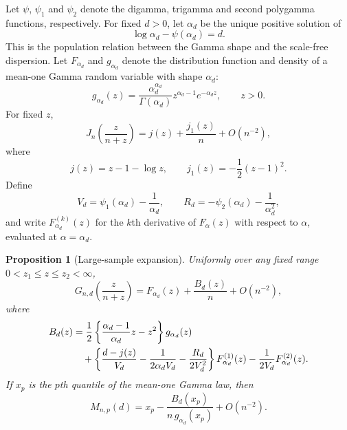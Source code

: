 \documentclass[11pt]{article}
\newtheorem{proposition}[theorem]{Proposition}
\theoremstyle{remark}
\begin{document}
Let $\psi$, $\psi_1$ and $\psi_2$ denote the digamma, trigamma and second polygamma functions, respectively. For fixed $d>0$, let $\alpha_d$ be the unique positive solution of
\begin{equation}
 \log\alpha_d-\psi(\alpha_d)=d.
 \label{eq:alpha_d}
\end{equation}
This is the population relation between the Gamma shape and the scale-free dispersion. Let $F_{\alpha_d}$ and $g_{\alpha_d}$ denote the distribution function and density of a mean-one Gamma random variable with shape $\alpha_d$:
\begin{equation}
 g_{\alpha_d}(z)
 =\frac{\alpha_d^{\alpha_d}}{\Gamma(\alpha_d)}
 z^{\alpha_d-1}e^{-\alpha_d z},
 \qquad z>0.
 \label{eq:mean_one_gamma}
\end{equation}
For fixed $z$,
\begin{equation}
 J_n\!\left(\frac{z}{n+z}\right)
 =j(z)+\frac{j_1(z)}{n}+O(n^{-2}),
 \label{eq:J_large_n}
\end{equation}
where
\begin{equation}
 j(z)=z-1-\log z,
 \qquad
 j_1(z)=-\frac12(z-1)^2.
 \label{eq:j_def}
\end{equation}
Define
\begin{equation}
 V_d=\psi_1(\alpha_d)-\frac1{\alpha_d},
 \qquad
 R_d=-\psi_2(\alpha_d)-\frac1{\alpha_d^2},
 \label{eq:VR}
\end{equation}
and write $F_{\alpha_d}^{(k)}(z)$ for the $k$th derivative of $F_\alpha(z)$ with respect to $\alpha$, evaluated at $\alpha=\alpha_d$.

\begin{proposition}[Large-sample expansion]
\label{prop:large_n}
Uniformly over any fixed range $0<z_1\le z\le z_2<\infty$,
\begin{equation}
 G_{n,d}\!\left(\frac{z}{n+z}\right)
 =F_{\alpha_d}(z)+\frac{B_d(z)}{n}+O(n^{-2}),
 \label{eq:large_n_cdf}
\end{equation}
where
\begin{align}
 B_d(z)
 &=\frac12\left\{\frac{\alpha_d-1}{\alpha_d}z-z^2\right\}
       g_{\alpha_d}(z) \notag\\
 &\quad+
 \left\{\frac{d-j(z)}{V_d}-\frac1{2\alpha_d V_d}-\frac{R_d}{2V_d^2}\right\}
       F_{\alpha_d}^{(1)}(z)
 -\frac1{2V_d}F_{\alpha_d}^{(2)}(z).
 \label{eq:B_d}
\end{align}
If $x_p$ is the $p$th quantile of the mean-one Gamma law, then
\begin{equation}
 M_{n,p}(d)
 =x_p-\frac{B_d(x_p)}{n\,g_{\alpha_d}(x_p)}+O(n^{-2}).
 \label{eq:large_n_quantile}
\end{equation}
\end{proposition}
\end{document}
